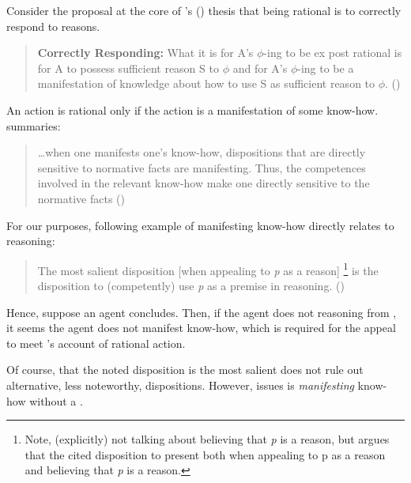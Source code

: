 \begin{note}
  Consider the proposal at the core of \citeauthor{Lord:2018aa}'s (\citeyear{Lord:2018aa}) thesis that being rational is to correctly respond to reasons.

  \begin{quote}
    \textbf{Correctly Responding:} What it is for A's \(\phi\)-ing to be ex post rational is for A to possess sufficient reason S to \(\phi\) and for A's \(\phi\)-ing to be a manifestation of knowledge about how to use S as sufficient reason to \(\phi\).%
    \mbox{}\hfill\mbox{(\citeyear[143]{Lord:2018aa})}
  \end{quote}

  An \agents{} action is rational only if the action is a manifestation of some know-how.
  \citeauthor{Lord:2018aa} summaries:

  \begin{quote}
    \dots when one manifests one's know-how, dispositions that are directly sensitive to normative facts are manifesting. Thus, the competences involved in the relevant know-how make one directly sensitive to the normative facts%
    \mbox{}\hfill\mbox{(\citeyear[16]{Lord:2018aa})}
  \end{quote}

  For our purposes, following example of manifesting know-how directly relates to reasoning:

  \begin{quote}
    The most salient disposition [when appealing to \emph{p} as a reason]%
    \footnote{
      Note, \citeauthor{Lord:2018aa} (explicitly) not talking about believing that \emph{p} is a reason, but argues that the cited disposition to present both when appealing to p as a reason and believing that \emph{p} is a reason.
    }
    is the disposition to (competently) use \emph{p} as a premise in reasoning.\newline
    \mbox{}\hfill\mbox{(\citeyear[25]{Lord:2018aa})}
  \end{quote}

  Hence, suppose an agent concludes.
  Then, if the agent does not \wit{} reasoning from \poP{}, it seems the agent does not manifest know-how, which is required for the appeal to meet \citeauthor{Lord:2018aa}'s account of rational action.

  Of course, that the noted disposition is the most salient does not rule out alternative, less noteworthy, dispositions.
  However, issues is \emph{manifesting} know-how without a \wit{}.
\end{note}

